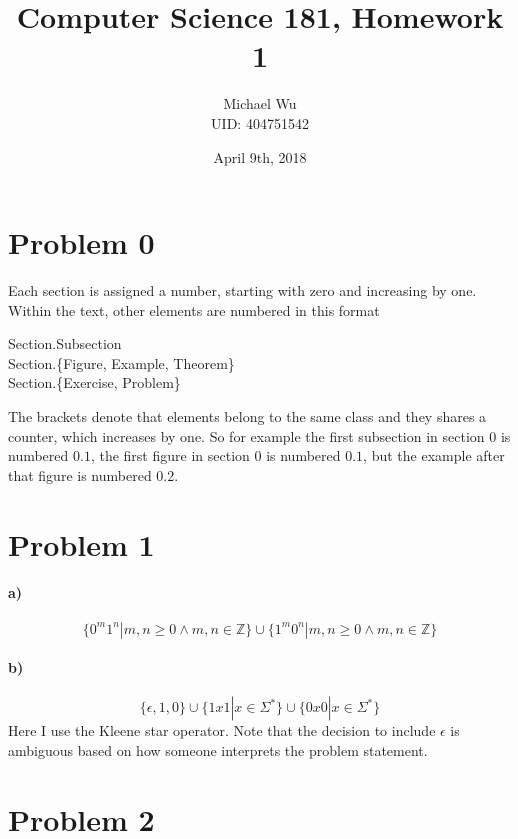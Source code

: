\documentclass[12pt]{article}
\begin{document}
\title{Computer Science 181, Homework 1}
\date{April 9th, 2018}
\author{Michael Wu\\UID: 404751542}
\maketitle

\section*{Problem 0}

Each section is assigned a number, starting with zero and increasing by one. Within the text, other elements are numbered in this format
\begin{center}
        Section.Subsection\\
        Section.\{Figure, Example, Theorem\}\\
        Section.\{Exercise, Problem\}\\
\end{center}
The brackets denote that elements belong to the same class and they shares a counter, which increases by one. So for example the first
subsection in section \(0\) is numbered \(0.1\), the first figure in section \(0\) is numbered \(0.1\), but the example after that figure
is numbered \(0.2\).

\section*{Problem 1}

\paragraph{a)}

\[\{0^m1^n|m,n\geq0 \wedge m,n\in\mathbb{Z} \}\cup\{1^m0^n|m,n\geq0 \wedge m,n\in\mathbb{Z}\}\]

\paragraph{b)}

\[\{\epsilon,1,0\}\cup\{1x1|x\in\Sigma^*\}\cup\{0x0|x\in\Sigma^*\}\]
Here I use the Kleene star operator. Note that the decision to include \(\epsilon\) is ambiguous based on
how someone interprets the problem statement.

\section*{Problem 2}
\end{document}
